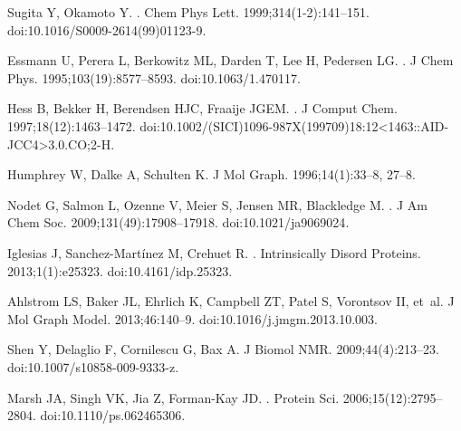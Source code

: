 \documentclass[10pt,letterpaper]{article}
\begin{document}
\begin{thebibliography}{10}
Sugita Y, Okamoto Y.
.
\newblock Chem Phys Lett. 1999;314(1-2):141--151.
\newblock doi:{10.1016/S0009-2614(99)01123-9}.

Essmann U, Perera L, Berkowitz ML, Darden T, Lee H, Pedersen LG.
.
\newblock J Chem Phys. 1995;103(19):8577--8593.
\newblock doi:{10.1063/1.470117}.

Hess B, Bekker H, Berendsen HJC, Fraaije JGEM.
.
\newblock J Comput Chem. 1997;18(12):1463--1472.
\newblock doi:{10.1002/(SICI)1096-987X(199709)18:12\textless1463::AID-JCC4\textgreater3.0.CO;2-H}.

Humphrey W, Dalke A, Schulten K.
\newblock J Mol Graph. 1996;14(1):33--8, 27--8.

Nodet G, Salmon L, Ozenne V, Meier S, Jensen MR, Blackledge M.
.
\newblock J Am Chem Soc. 2009;131(49):17908--17918.
\newblock doi:{10.1021/ja9069024}.

Iglesias J, Sanchez-Mart{\'{i}}nez M, Crehuet R.
.
\newblock Intrinsically Disord Proteins. 2013;1(1):e25323.
\newblock doi:{10.4161/idp.25323}.

Ahlstrom LS, Baker JL, Ehrlich K, Campbell ZT, Patel S, Vorontsov II, et~al.
\newblock J Mol Graph Model. 2013;46:140--9.
\newblock doi:{10.1016/j.jmgm.2013.10.003}.

Shen Y, Delaglio F, Cornilescu G, Bax A.
\newblock J Biomol NMR. 2009;44(4):213--23.
\newblock doi:{10.1007/s10858-009-9333-z}.

Marsh JA, Singh VK, Jia Z, Forman-Kay JD.
.
\newblock Protein Sci. 2006;15(12):2795--2804.
\newblock doi:{10.1110/ps.062465306}.


\end{thebibliography}
\end{document}
